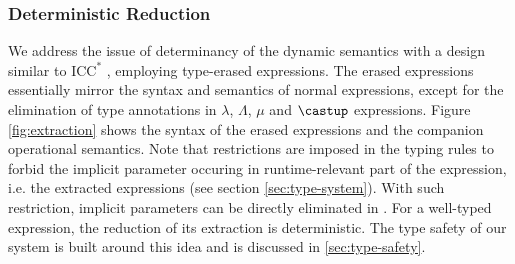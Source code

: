\subsubsection{Deterministic Reduction}
We address the issue of determinancy of the dynamic semantics with
a design similar to $\mathrm{ICC}^*$ \cite{barras2008implicit},
employing type-erased expressions. The erased expressions
essentially mirror the syntax and semantics
of normal expressions, except for the elimination of type annotations in $\lambda$,
$\Lambda$, $\mu$ and $\castup$ expressions.
Figure \ref{fig:extraction} shows the syntax of the erased expressions and
the companion operational semantics. Note that restrictions are imposed in the
typing rules to forbid the implicit parameter occuring in runtime-relevant part
of the expression, i.e. the extracted expressions (see section \ref{sec:type-system}).
With such restriction, implicit parameters can be directly eliminated in
. For a well-typed expression, the reduction of
its extraction is deterministic. The type safety of our system is built around
this idea and is discussed in \ref{sec:type-safety}.

